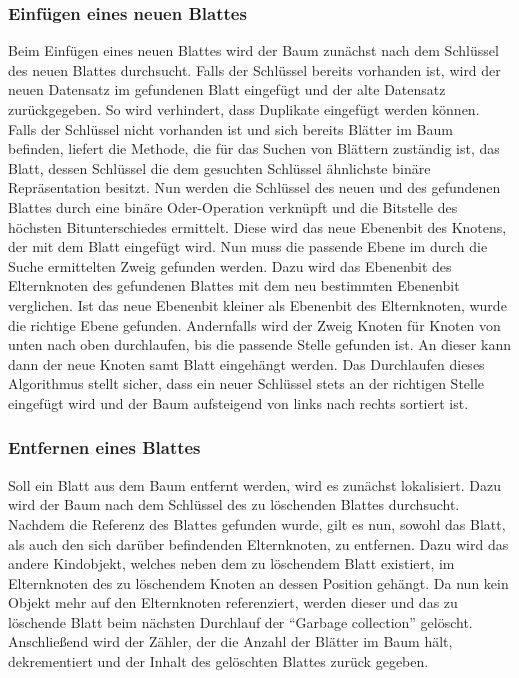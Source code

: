 \documentclass[a4paper,11pt,oneside,%
headsepline,												%
footsepline,												%
bibtotocnumbered									%
]{scrreprt}
\begin{document}
\subsubsection{Einfügen eines neuen Blattes}
Beim Einfügen eines neuen Blattes wird der Baum zunächst nach dem Schlüssel des neuen Blattes durchsucht. Falls der Schlüssel bereits vorhanden ist, wird der neuen Datensatz im gefundenen Blatt eingefügt und der alte Datensatz zurückgegeben. So wird verhindert, dass Duplikate eingefügt werden können. Falls der Schlüssel nicht vorhanden ist und sich bereits Blätter im Baum befinden, liefert die Methode, die für das Suchen von Blättern zuständig ist, das Blatt, dessen Schlüssel die dem gesuchten Schlüssel ähnlichste binäre Repräsentation besitzt. Nun werden die Schlüssel des neuen und des gefundenen Blattes durch eine binäre Oder-Operation verknüpft und die Bitstelle des höchsten Bitunterschiedes ermittelt. Diese wird das neue Ebenenbit des Knotens, der mit dem Blatt eingefügt wird. Nun muss die passende Ebene im durch die Suche ermittelten Zweig gefunden werden. Dazu wird das Ebenenbit des Elternknoten des gefundenen Blattes mit dem neu bestimmten Ebenenbit verglichen. Ist das neue Ebenenbit kleiner als Ebenenbit des Elternknoten, wurde die richtige Ebene gefunden. Andernfalls wird der Zweig Knoten für Knoten von unten nach oben durchlaufen, bis die passende Stelle gefunden ist. An dieser kann dann der neue Knoten samt Blatt eingehängt werden. Das Durchlaufen dieses Algorithmus stellt sicher, dass ein neuer Schlüssel stets an der richtigen Stelle eingefügt wird und der Baum aufsteigend von links nach rechts sortiert ist.
\subsubsection{Entfernen eines Blattes}
Soll ein Blatt aus dem Baum entfernt werden, wird es zunächst lokalisiert. Dazu wird der Baum nach dem Schlüssel des zu löschenden Blattes durchsucht. Nachdem die Referenz des Blattes gefunden wurde, gilt es nun, sowohl das Blatt, als auch den sich darüber befindenden Elternknoten, zu entfernen. Dazu wird das andere Kindobjekt, welches neben dem zu löschendem Blatt existiert, im Elternknoten des  zu löschendem Knoten an dessen Position gehängt. Da nun kein Objekt mehr auf den Elternknoten referenziert, werden dieser und das zu löschende Blatt beim nächsten Durchlauf der \enquote{Garbage collection} gelöscht. Anschließend wird der Zähler, der die Anzahl der Blätter im Baum hält, dekrementiert und der Inhalt des gelöschten Blattes zurück gegeben.
\end{document}
